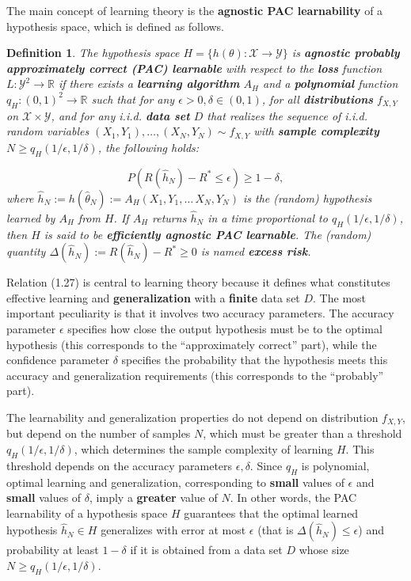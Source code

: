 \documentclass{report}
\newtheorem{definition}{Definition}[chapter]
\begin{document}
The main concept of learning theory is the \textbf{agnostic PAC learnability} of a hypothesis space, which is defined as follows.

\begin{definition}
The hypothesis space $H = \{h(\theta) : \mathcal{X} \to \mathcal{Y}\}$ is \textbf{agnostic probably approximately correct (PAC) learnable} with respect to the \textbf{loss} function $L : \mathcal{Y}^2 \to \mathbb{R}$ if there exists a \textbf{learning algorithm} $A_H$ and a \textbf{polynomial} function $q_H : (0,1) ^2 \to \mathbb{R}$ such that for any $\epsilon > 0,\delta \in (0,1)$, for all \textbf{distributions} $f_{X,Y}$ on $\mathcal{X} \times \mathcal{Y}$, and for any i.i.d. \textbf{data set} $D$ that realizes the sequence of i.i.d. random variables $(X_1, Y_1),\dots,(X_N, Y_N)\sim f_{X,Y}$ with \textbf{sample complexity} $N\geq q_H(1/\epsilon,1/\delta)$, the following holds:

\begin{equation}
P(R(\hat{h}_N) - R^* \leq \epsilon) \geq 1- \delta,
\end{equation}
where $\hat{h}_N := h(\hat{\theta}_N) := A_H(X_1, Y_1,\dots\,X_N, Y_N)$ is the (random) hypothesis learned by $A_H$ from $H$. If $A_H$ returns $\hat{h}_N$ in a time proportional to $q_H(1/\epsilon,1/\delta)$, then $H$ is said to be \textbf{efficiently agnostic PAC learnable}. The (random) quantity $\Delta(\hat{h}_N) := R(\hat{h}_N) - R^* \geq 0$ is named \textbf{excess risk}.
\end{definition}

Relation (1.27) is central to learning theory because it defines what constitutes effective learning and \textbf{generalization} with a \textbf{finite} data set $D$. The most important peculiarity is that it involves two accuracy parameters. The accuracy parameter $\epsilon$ specifies how close the output hypothesis must be to the optimal hypothesis (this corresponds to the “approximately correct” part), while the confidence parameter $\delta$ specifies the probability that the hypothesis meets this accuracy and generalization requirements (this corresponds to the “probably” part).

The learnability and generalization properties do not depend on distribution $f_{X,Y}$, but depend on the number of samples $N$, which must be greater than a threshold $q_H(1/\epsilon,1/\delta)$, which determines the sample complexity of learning $H$. This threshold depends on the accuracy parameters $\epsilon,\delta$. Since $q_H$ is polynomial, optimal learning and generalization, corresponding to \textbf{small} values of $\epsilon$ and \textbf{small} values of $\delta$, imply a \textbf{greater} value of $N$. In other words, the PAC learnability of a hypothesis space $H$ guarantees that the optimal learned hypothesis $\hat{h}_N \in H$ generalizes with error at most $\epsilon$ (that is $\Delta(\hat{h}_N) \leq \epsilon$) and probability at least $1-\delta$ if it is obtained from a data set $D$ whose size $N \geq q_H(1/\epsilon,1/\delta)$.
\end{document}
